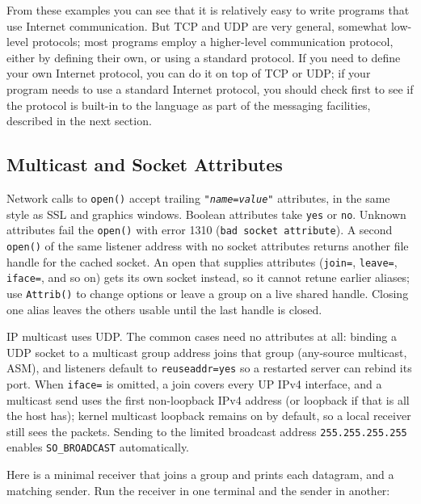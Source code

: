 From these examples you can see that it is relatively easy to write
programs that use Internet communication. But TCP and UDP are very
general, somewhat low-level protocols; most programs employ a
higher-level communication protocol, either by defining their own, or
using a standard protocol. If you need to define your own Internet
protocol, you can do it on top of TCP or UDP; if your program needs to
use a standard Internet protocol, you should check first to see if the
protocol is built-in to the language as part of the messaging
facilities, described in the next section.

\subsection*{Multicast and Socket Attributes}
Network calls to \texttt{open()} accept trailing
\texttt{"\textit{name}=\textit{value}"} attributes, in the same style as
SSL and graphics windows. Boolean attributes take \texttt{yes} or
\texttt{no}. Unknown attributes fail the \texttt{open()} with error
1310 (\texttt{bad socket attribute}).
A second \texttt{open()} of the same listener address with no socket
attributes returns another file handle for the cached socket. An open
that supplies attributes (\texttt{join=}, \texttt{leave=},
\texttt{iface=}, and so on) gets its own socket instead, so it cannot
retune earlier aliases; use \texttt{Attrib()} to change options or leave
a group on a live shared handle. Closing one alias leaves the others
usable until the last handle is closed.

IP multicast uses UDP. The common cases need no
attributes at all: binding a UDP socket to a multicast group address
joins that group (any-source multicast, ASM), and listeners default to
\texttt{reuseaddr=yes} so a restarted server can rebind its port.
When \texttt{iface=} is omitted, a join covers every UP IPv4
interface, and a multicast send uses the first non-loopback IPv4
address (or loopback if that is all the host has); kernel multicast
loopback remains on by default, so a local receiver still sees the
packets. Sending to the limited broadcast address
\texttt{255.255.255.255} enables \texttt{SO\_BROADCAST} automatically.

Here is a minimal receiver that joins a group and prints each
datagram, and a matching sender. Run the receiver in one terminal and
the sender in another:


